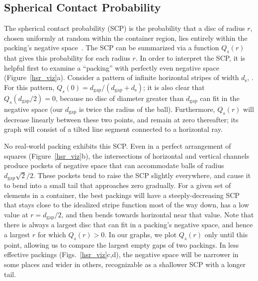 \subsection{Spherical Contact Probability}

The spherical contact probability (SCP) is the probability that a 
disc of radius $r$, chosen
uniformly at random within the container region, lies entirely within the 
packing's negative space~\cite{Chiu2013}.
The SCP can be summarized via a function $Q_s(r)$ that gives this 
probability for each radius $r$.
In order to interpret the SCP, it is helpful first to
examine a ``packing'' with perfectly even negative space (Figure~\ref{hsr_viz}a).
Consider a pattern of infinite horizontal stripes of width $d_\mathrm{s}$,
.  For this pattern,
$Q_s(0)=d_\mathrm{gap}/(d_\mathrm{gap}+d_\mathrm{s})$; it is also
clear that $Q_s(d_\mathrm{gap}/2)=0$, because no disc of diameter greater
than $d_\mathrm{gap}$ can fit in the negative space
(our $d_\mathrm{gap}$ is twice the radius of the ball).
Furthermore,
$Q_s(r)$ will decrease linearly between these two points, and remain
at zero thereafter; its graph will consist of a tilted line segment
connected to a horizontal ray.




No real-world packing exhibits this SCP.  Even in a perfect arrangement
of squares (Figure~\ref{hsr_viz}b), the intersections of horizontal and
vertical channels
produce pockets of negative space that can accommodate balls of
radius $d_\mathrm{gap}\sqrt{2}/2$.  These pockets tend to raise the SCP
slightly everywhere, and cause it to bend into a small tail that
approaches zero gradually.
For a given set of elements in a container, the best packings will
have a steeply-decreasing SCP that stays close to the idealized stripe function most
of the way down, has a low value at $r=d_\mathrm{gap}/2$,
and then bends towards horizontal near that value.
Note that there is always a largest disc that can fit in a packing's
negative space, and hence a largest $r$ for which $Q_s(r)>0$.  
In our graphs, we plot $Q_s(r)$ only until this point, allowing us
to compare the largest empty gaps of two packings.
In less effective packings (Figs.~\ref{hsr_viz}c,d), the negative space 
will be narrower in
some places and wider in others, recognizable as a shallower SCP
with a longer tail.

